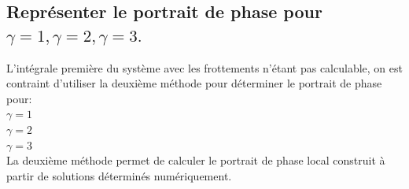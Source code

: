 \documentclass[10pt,a4paper]{article}
\begin{document}
\subsection{Représenter le portrait de phase pour $\gamma=1, \gamma=2, \gamma=3.$}
L'intégrale première du système avec les frottements n'étant pas calculable, on est contraint d'utiliser la deuxième méthode pour déterminer le portrait de phase pour:\\
$\gamma=1$\\
$\gamma=2$\\
$\gamma=3$\\
La deuxième méthode permet de calculer le portrait de phase local construit à partir de solutions déterminés numériquement.  
\end{document}
